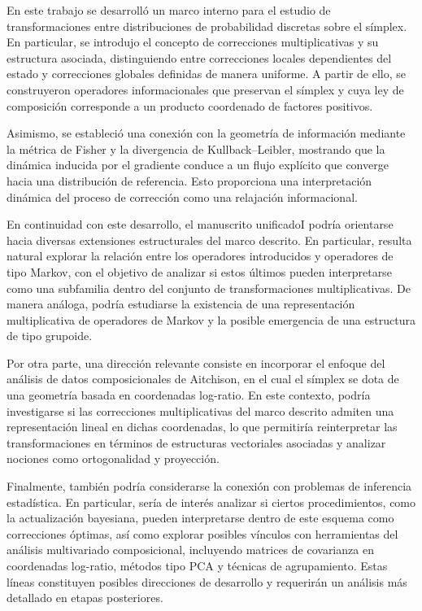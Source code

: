 ﻿\documentclass[12pt]{article}
\begin{document}
En este trabajo se desarrolló un marco interno para el estudio de transformaciones entre distribuciones de probabilidad discretas sobre el símplex. En particular, se introdujo el concepto de correcciones multiplicativas y su estructura asociada, distinguiendo entre correcciones locales dependientes del estado y correcciones globales definidas de manera uniforme. A partir de ello, se construyeron operadores informacionales que preservan el símplex y cuya ley de composición corresponde a un producto coordenado de factores positivos.

Asimismo, se estableció una conexión con la geometría de información mediante la métrica de Fisher y la divergencia de Kullback--Leibler, mostrando que la dinámica inducida por el gradiente conduce a un flujo explícito que converge hacia una distribución de referencia. Esto proporciona una interpretación dinámica del proceso de corrección como una relajación informacional.

En continuidad con este desarrollo, el manuscrito unificadoI podría orientarse hacia diversas extensiones estructurales del marco descrito. En particular, resulta natural explorar la relación entre los operadores introducidos y operadores de tipo Markov, con el objetivo de analizar si estos últimos pueden interpretarse como una subfamilia dentro del conjunto de transformaciones multiplicativas. De manera análoga, podría estudiarse la existencia de una representación multiplicativa de operadores de Markov y la posible emergencia de una estructura de tipo grupoide.

Por otra parte, una dirección relevante consiste en incorporar el enfoque del análisis de datos composicionales de Aitchison, en el cual el símplex se dota de una geometría basada en coordenadas log-ratio. En este contexto, podría investigarse si las correcciones multiplicativas del marco descrito admiten una representación lineal en dichas coordenadas, lo que permitiría reinterpretar las transformaciones en términos de estructuras vectoriales asociadas y analizar nociones como ortogonalidad y proyección.

Finalmente, también podría considerarse la conexión con problemas de inferencia estadística. En particular, sería de interés analizar si ciertos procedimientos, como la actualización bayesiana, pueden interpretarse dentro de este esquema como correcciones óptimas, así como explorar posibles vínculos con herramientas del análisis multivariado composicional, incluyendo matrices de covarianza en coordenadas log-ratio, métodos tipo PCA y técnicas de agrupamiento. Estas líneas constituyen posibles direcciones de desarrollo y requerirán un análisis más detallado en etapas posteriores.
\clearpage



\end{document}
